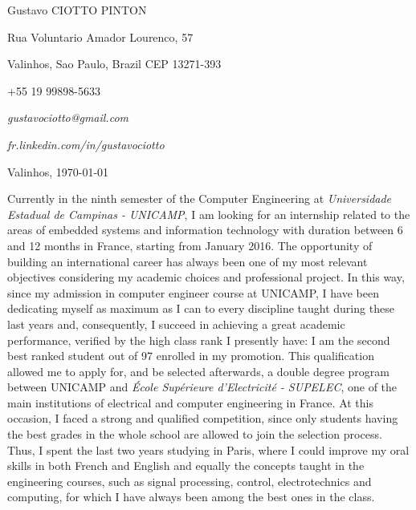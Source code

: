 \documentclass[12pt, a4paper]{article}
\begin{document}
\pagestyle{empty} 

Gustavo CIOTTO PINTON

Rua Voluntario Amador Lourenco, 57

Valinhos, Sao Paulo, Brazil CEP 13271-393

+55 19 99898-5633	

\textit{gustavociotto@gmail.com}

\textit{fr.linkedin.com/in/gustavociotto}

\vspace{12pt}

\begin{flushright}
Valinhos,  \today





\end{flushright}

\vspace{12pt}

Currently in the ninth semester of the Computer Engineering at
\textit{Universidade Estadual de Campinas - UNICAMP}, I am looking for an
internship related to the areas of embedded systems and information technology
with duration between 6 and 12 months in France, starting from January 2016. The opportunity of
building an international career has always been one of my most relevant
objectives considering my academic choices and professional project. In this
way, since my admission in computer engineer course at UNICAMP, I have been
dedicating myself as maximum as I can to every discipline taught during these
last years and, consequently, I succeed in achieving a great academic
performance, verified by the high class rank I presently have: I am the second
best ranked student out of 97 enrolled in my promotion. This qualification
allowed me to apply for, and be selected afterwards, a double degree program
between UNICAMP and \textit{École Supérieure d'Electricité - SUPELEC}, one of
the main institutions of electrical and computer engineering in France. At this
occasion, I faced a strong and qualified competition, since only students
having the best grades in the whole school are allowed to join the selection
process. Thus, I spent the last two years studying in Paris, where I could
improve my oral skills in both French and English and equally the concepts
taught in the engineering courses, such as signal processing, control,
electrotechnics and computing, for which I have always been among the best ones
in the class.
\end{document}
